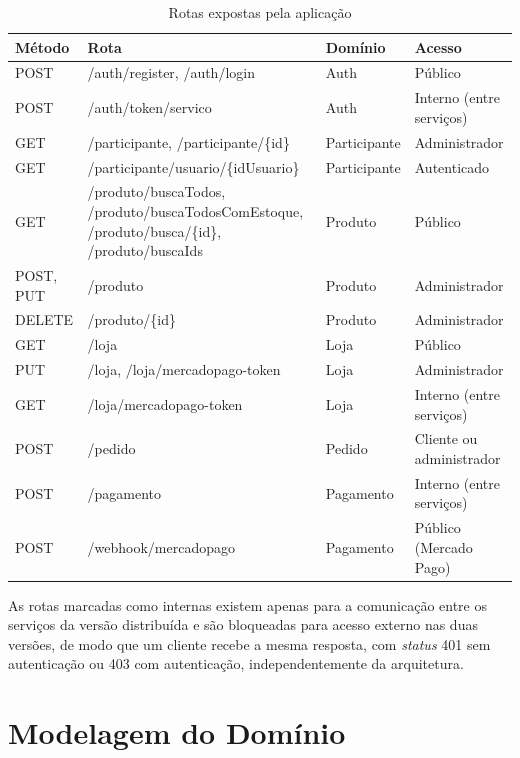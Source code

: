 \begin{table}[htbp]
\centering
\caption{Rotas expostas pela aplicação}
\label{tab:rotas}
\small
\begin{tabular}{|>{\raggedright\arraybackslash}p{1.8cm}|>{\raggedright\arraybackslash}p{6.0cm}|>{\raggedright\arraybackslash}p{2.6cm}|>{\raggedright\arraybackslash}p{4.2cm}|}
\hline
\textbf{Método} & \textbf{Rota} & \textbf{Domínio} & \textbf{Acesso} \\ \hline
POST & /auth/register, /auth/login & Auth & Público \\ \hline
POST & /auth/token/servico & Auth & Interno (entre serviços) \\ \hline
GET & /participante, /participante/\{id\} & Participante & Administrador \\ \hline
GET & /participante/usuario/\{idUsuario\} & Participante & Autenticado \\ \hline
GET & /produto/buscaTodos, /produto/buscaTodosComEstoque, /produto/busca/\{id\}, /produto/buscaIds & Produto & Público \\ \hline
POST, PUT & /produto & Produto & Administrador \\ \hline
DELETE & /produto/\{id\} & Produto & Administrador \\ \hline
GET & /loja & Loja & Público \\ \hline
PUT & /loja, /loja/mercadopago-token & Loja & Administrador \\ \hline
GET & /loja/mercadopago-token & Loja & Interno (entre serviços) \\ \hline
POST & /pedido & Pedido & Cliente ou administrador \\ \hline
POST & /pagamento & Pagamento & Interno (entre serviços) \\ \hline
POST & /webhook/mercadopago & Pagamento & Público (Mercado Pago) \\ \hline
\end{tabular}
\par\vspace{4pt}{\footnotesize Fonte: Elaborada pelo autor (2026).}
\end{table}

As rotas marcadas como internas existem apenas para a comunicação entre os serviços da versão
distribuída e são bloqueadas para acesso externo nas duas versões, de modo que um cliente
recebe a mesma resposta, com \textit{status} 401 sem autenticação ou 403 com autenticação,
independentemente da arquitetura.

\section{Modelagem do Domínio}


